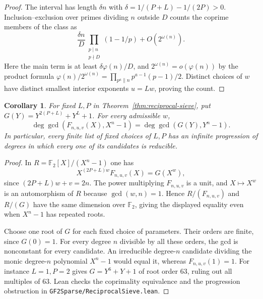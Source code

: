 \documentclass[11pt]{article}
\newtheorem{corollary}[theorem]{Corollary}
\newcommand{\F}{\mathbb F_2}
\begin{document}
\begin{proof}
The interval has length \(\delta n\) with
\(\delta=1/(P+L)-1/(2P)>0\). Inclusion--exclusion over primes
dividing \(n\) outside \(D\) counts the coprime members of the class as
\[
 \frac{\delta n}{D}\prod_{\substack{p\mid n\\p\nmid D}}(1-1/p)
       +O(2^{\omega(n)}).
\]
Here the main term is at least \(\delta\varphi(n)/D\), and
\(2^{\omega(n)}=o(\varphi(n))\) by the product formula
\(\varphi(n)/2^{\omega(n)}=\prod_{p^a\parallel n}p^{a-1}(p-1)/2\).
Distinct choices of \(w\) have distinct smallest interior exponents
\(u=Lw\), proving the count.
\end{proof}

\begin{corollary}\label{cor:reciprocal-obstruction}
For fixed \(L,P\) in Theorem~\ref{thm:reciprocal-sieve}, put
\(G(Y)=Y^{2(P+L)}+Y^L+1\). For every admissible \(w\),
\[
 \deg\gcd(F_{n,u,v}(X),X^n-1)=\deg\gcd(G(Y),Y^n-1).
\]
In particular, every finite list of fixed choices of \(L,P\) has an
infinite progression of degrees in which every one of its candidates
is reducible.
\end{corollary}
\begin{proof}
In \(R=\F[X]/(X^n-1)\) one has
\[
          X^{(2P+L)w}F_{n,u,v}(X)=G(X^w),
\]
since \((2P+L)w+v=2n\). The power multiplying \(F_{n,u,v}\) is a
unit, and \(X\mapsto X^w\) is an automorphism of \(R\) because
\(\gcd(w,n)=1\). Hence \(R/(F_{n,u,v})\) and \(R/(G)\) have the same
dimension over \(\F\), giving the displayed equality even when
\(X^n-1\) has repeated roots.

Choose one root of \(G\) for each fixed choice of parameters.
Their orders are finite, since \(G(0)=1\). For every degree \(n\)
divisible by all these orders, the gcd is nonconstant for every
candidate. An irreducible degree-\(n\) candidate dividing the monic
degree-\(n\) polynomial \(X^n-1\) would equal it, whereas
\(F_{n,u,v}(1)=1\). For instance \(L=1,P=2\) gives \(G=Y^6+Y+1\)
of root order 63, ruling out all multiples of 63. Lean checks the
coprimality equivalence and the progression obstruction in
\texttt{GF2Sparse/ReciprocalSieve.lean}.
\end{proof}
\end{document}
